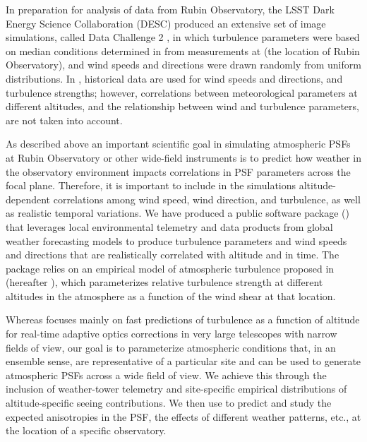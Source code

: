 \documentclass[twocolumn,twocolappendix]{openjournal}
\begin{document}
In preparation for analysis of data from Rubin Observatory, the LSST Dark Energy Science Collaboration (DESC) produced an extensive set of image simulations, called Data Challenge 2 \citep[DC2,][hereafter \dcii]{the_lsst_dark_energy_science_collaboration_lsst_2021}, in which turbulence parameters were based on median conditions determined in \cite{ellerbroek_efficient_2002} from measurements at \cp (the location of Rubin Observatory), and wind speeds and directions were drawn randomly from uniform distributions. 
In \cite{peterson_simulation_2015}, historical data are used for wind speeds and directions, and turbulence strengths; however, correlations between meteorological parameters at different altitudes, and the relationship between wind and turbulence parameters, are not taken into account.


As described above an important scientific goal in simulating atmospheric PSFs at Rubin Observatory or other wide-field instruments is to predict how weather in the observatory environment impacts correlations in PSF parameters across the focal plane. 
Therefore, it is important to include in the simulations altitude-dependent correlations among wind speed, wind direction, and turbulence, as well as realistic temporal variations.
We have produced a public software package (\psfws) that leverages local environmental telemetry and data products from global weather forecasting models to produce turbulence parameters and wind speeds and directions that are realistically correlated with altitude and in time. 
The package relies on an empirical model of atmospheric turbulence proposed in \cite{osborn_optical_2018} (hereafter \osborn), which parameterizes relative turbulence strength at different altitudes in the atmosphere as a function of the wind shear at that location. 

Whereas \osborn focuses mainly on fast predictions of turbulence as a function of altitude for real-time adaptive optics corrections in very large telescopes with narrow fields of view, our goal is to parameterize atmospheric conditions that, in an ensemble sense, are representative of a particular site and can be used to generate atmospheric PSFs across a wide field of view. 
We achieve this through the inclusion of weather-tower telemetry and site-specific empirical distributions of altitude-specific seeing contributions. 
We then use \psfws to predict and study the expected anisotropies in the PSF, the effects of different weather patterns, etc., at the location of a specific observatory.
\end{document}
